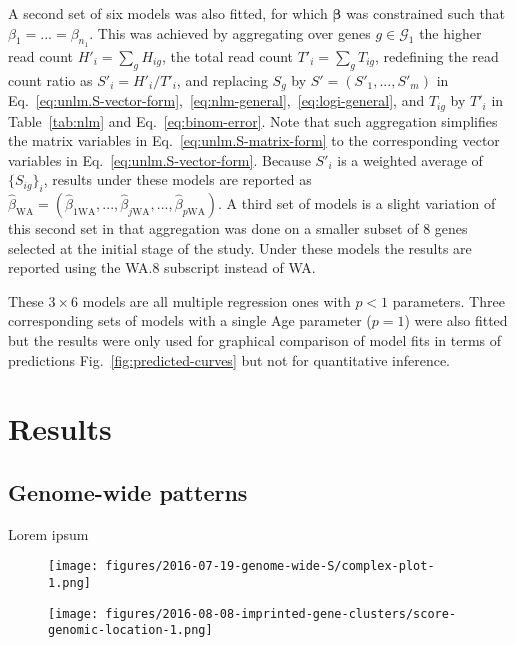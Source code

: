 \documentclass[letterpaper]{article}
\begin{document}
A second set of six models was also
fitted, for which \(\boldsymbol{\beta}\) was constrained such that \(\beta_1 =
... = \beta_{n_1}\).  This was achieved by aggregating over genes
\(g\in\mathcal{G}_1\) the higher read count \(H'_i = \sum_g H_{ig}\), the
total read count \(T'_i = \sum_g T_{ig}\), redefining the read count ratio
as \(S'_i = H'_i / T'_i\), and replacing \(S_g\) by \(S'=(S'_1,...,S'_m)\) in
Eq.~\ref{eq:unlm.S-vector-form},~\ref{eq:nlm-general},~\ref{eq:logi-general}, and \(T_{ig}\) by \(T'_i\) in
Table~\ref{tab:nlm} and Eq.~\ref{eq:binom-error}.  Note that such aggregation
simplifies the matrix variables in Eq.~\ref{eq:unlm.S-matrix-form} to the
corresponding vector variables in Eq.~\ref{eq:unlm.S-vector-form}.  Because \(S'_i\) is a
weighted average of \(\{S_{ig}\}_i\), results under these models are reported
as \(\hat{\beta}_\mathrm{WA} =
(\hat{\beta}_{1\mathrm{WA}},...,\hat{\beta}_{j\mathrm{WA}},...,\hat{\beta}_{p\mathrm{WA}})\).  A
third set of models is a slight variation of this second set in that
aggregation was done on a smaller subset of 8 genes selected at the initial
stage of the study.  Under these models the results are reported using the
WA.8 subscript instead of WA.

These \(3\times 6\) models are all multiple regression ones with \(p<1\)
parameters.  Three corresponding sets of models with a single Age parameter
(\(p=1\)) were also fitted but the results were only used for graphical
comparison of model fits in terms of predictions
Fig.~\ref{fig:predicted-curves} but not for quantitative inference.

\section{Results}

\subsection{Genome-wide patterns}

Lorem ipsum

\begin{figure}
\begin{center}
\texttt{[image: figures/2016-07-19-genome-wide-S/complex-plot-1.png]}
\end{center}
\caption{}
\label{fig:ranking-genes}
\end{figure}

\begin{figure}
\begin{center}
\texttt{[image: figures/2016-08-08-imprinted-gene-clusters/score-genomic-location-1.png]}
\end{center}
\caption{}
\label{fig:clusters}
\end{figure}
\end{document}
